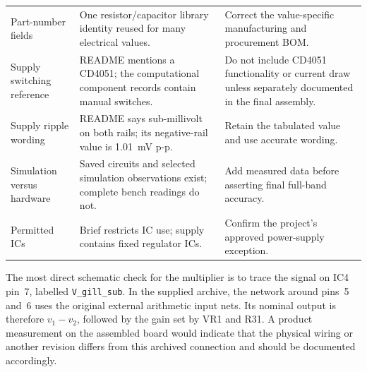 \documentclass[11pt,a4paper]{article}
\begin{document}
\begin{longtable}{P{0.21\textwidth}P{0.36\textwidth}P{0.34\textwidth}}
Part-number fields & One resistor/capacitor library identity reused for many electrical values. & Correct the value-specific manufacturing and procurement BOM.\\
Supply switching reference & README mentions a CD4051; the computational component records contain manual switches. & Do not include CD4051 functionality or current draw unless separately documented in the final assembly.\\
Supply ripple wording & README says sub-millivolt on both rails; its negative-rail value is 1.01~mV p-p. & Retain the tabulated value and use accurate wording.\\
Simulation versus hardware & Saved circuits and selected simulation observations exist; complete bench readings do not. & Add measured data before asserting final full-band accuracy.\\
Permitted ICs & Brief restricts IC use; supply contains fixed regulator ICs. & Confirm the project's approved power-supply exception.\\
\bottomrule
\end{longtable}

The most direct schematic check for the multiplier is to trace the signal on IC4 pin~7, labelled \texttt{V\_\allowbreak{}gill\_\allowbreak{}sub}. In the supplied archive, the network around pins~5 and~6 uses the original external arithmetic input nets. Its nominal output is therefore $v_1-v_2$, followed by the gain set by VR1 and R31. A product measurement on the assembled board would indicate that the physical wiring or another revision differs from this archived connection and should be documented accordingly.
\end{document}
